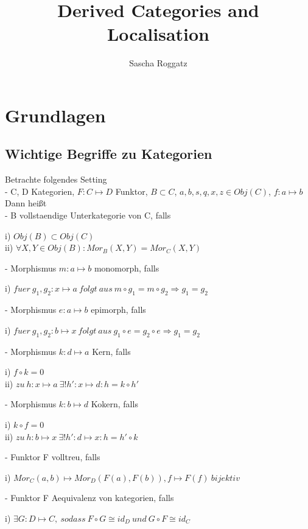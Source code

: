 \documentclass[12pt]{article}
\begin{document}
\title{Derived Categories and Localisation}
\author{Sascha Roggatz}
\maketitle
\tableofcontents
\newpage

\section{Grundlagen}
\subsection{Wichtige Begriffe zu Kategorien}

Betrachte folgendes Setting\\
- C, D Kategorien, $F : C \mapsto D$ Funktor, $B \subset C$, $a,b,s,q,x,z \in Obj(C)$, $f : a \mapsto b$ \\
\newline
Dann heißt\\
- B  vollstaendige Unterkategorie von C, falls
\begin{description}
    \item[i) $Obj(B) \subset Obj(C)$]
    \item[ii) $\forall X,Y \in Obj(B): Mor_B(X,Y) = Mor_C(X,Y)$]  
\end{description}
- Morphismus $m : a \mapsto b$ monomorph, falls
\begin{description}
    \item[i) $fuer \: g_1,g_2 : x \mapsto a \: folgt \: aus \: m \circ g_1 = m \circ g_2 \Rightarrow g_1 = g_2$] 
\end{description}
- Morphismus $e : a \mapsto b$ epimorph, falls
\begin{description}
    \item[i) $fuer \: g_1,g_2 : b \mapsto x \: folgt \: aus \: g_1 \circ e = g_2 \circ e \Rightarrow g_1 = g_2$] 
\end{description}
- Morphismus $k : d \mapsto a$ Kern, falls
\begin{description}
    \item[i) $f \circ k = 0$]
    \item[ii) $zu \: h : x \mapsto a \: \exists ! h' : x \mapsto d: h = k \circ h'$] 
\end{description}
- Morphismus $k : b \mapsto d$ Kokern, falls
\begin{description}
    \item[i) $k \circ f = 0$]
    \item[ii) $zu \: h : b \mapsto x \: \exists ! h' : d \mapsto x: h = h' \circ k$] 
\end{description}
- Funktor F  volltreu, falls 
\begin{description}
    \item[i) $Mor_C(a,b) \mapsto Mor_D(F(a),F(b)), f \mapsto F(f) \: bijektiv$] 
\end{description}
- Funktor F  Aequivalenz von kategorien, falls
\begin{description}
    \item[i) $\exists G : D \mapsto C, \: sodass \: F \circ G \cong id_D \: und \: G \circ F \cong id_C$] 
\end{description}
\end{document}
